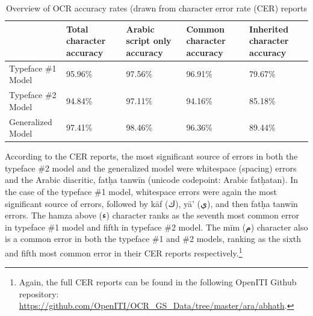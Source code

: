 \begin{table}[h!]
\begin{center}
\caption{Overview of OCR accuracy rates (drawn from character error rate (CER) reports}
\label{tab_champs:table_2}
\begin{tabularx}{\textwidth}{lp{2.2cm}p{2.2cm}p{2.2cm}p{2.2cm}} \toprule
& \textbf{Total character accuracy} & \textbf{Arabic script only accuracy} & \textbf{Common character accuracy\footnotemark[17]} & \textbf{Inherited character accuracy\footnotemark[18]}\\\midrule
Typeface \#1 Model & 95.96\% & 97.56\% & 96.91\% & 79.67\%\\ 
Typeface \#2 Model & 94.84\% & 97.11\% & 94.16\% & 85.18\% \\
Generalized Model & 97.41\% & 98.46\% & 96.36\% & 89.44\%\\
\bottomrule
\end{tabularx}
\end{center}
\end{table}



\addtocounter{footnote}{2}

\label{s:whitespace}
According to the CER reports, the most significant source of errors in both the
typeface \#2 model and the generalized model were whitespace (spacing) errors
and the Arabic diacritic, fatḥa tanwīn (unicode codepoint: Arabic fatḥatan). In
the case of the typeface \#1 model, whitespace errors were again the most
significant source of errors, followed by kāf (\textarabic{ك}), yā’ (\textarabic{ي}), and then fatḥa
tanwīn errors. The hamza above (\textarabic{ء}) character ranks as the seventh most common
error in typeface \#1 model and fifth in typeface \#2 model. The mīm (\textarabic{م})
character also is a common error in both the typeface \#1 and \#2 models, ranking
as the sixth and fifth most common error in their CER reports
respectively.\footnote{ Again, the full CER reports can be found in the
following OpenITI Github repository:
\url{https://github.com/OpenITI/OCR_GS_Data/tree/master/ara/abhath}.}

